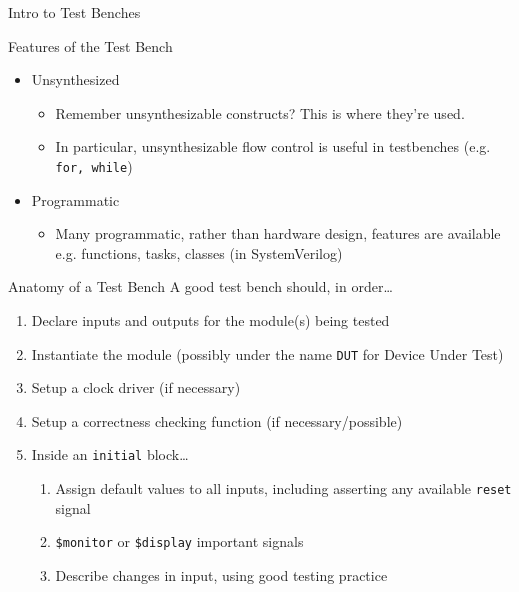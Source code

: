 \documentclass[table,dvipsnames,colorlinks=true]{beamer}
\begin{document}
\begin{frame}{Intro to Test Benches}
    \begin{block}{Features of the Test Bench}
        \begin{itemize}
            \item Unsynthesized
                \begin{itemize}
                    \item Remember unsynthesizable constructs? This is where
                        they're used.
                    \item In particular, unsynthesizable flow control is useful
                        in testbenches (e.g. \texttt{for, while})
                \end{itemize}
            \item Programmatic
                \begin{itemize}
                    \item Many programmatic, rather than hardware design,
                        features are available \\
                        e.g. functions, tasks, classes (in SystemVerilog)
                \end{itemize}
        \end{itemize}
    \end{block}
\end{frame}

\begin{frame}{Anatomy of a Test Bench}
    A good test bench should, in order\dots
    \begin{enumerate}
        \item Declare inputs and outputs for the module(s) being tested
        \item Instantiate the module (possibly under the name \texttt{DUT} for
            Device Under Test)
        \item Setup a clock driver (if necessary)
        \item Setup a correctness checking function (if necessary/possible)
        \item Inside an \texttt{initial} block\dots 
            \begin{enumerate}
                \item Assign default values to all inputs, including asserting
                    any available \texttt{reset} signal
                \item \texttt{\$monitor} or \texttt{\$display} important signals
                \item Describe changes in input, using good testing practice
            \end{enumerate}
    \end{enumerate}
\end{frame}
\end{document}
